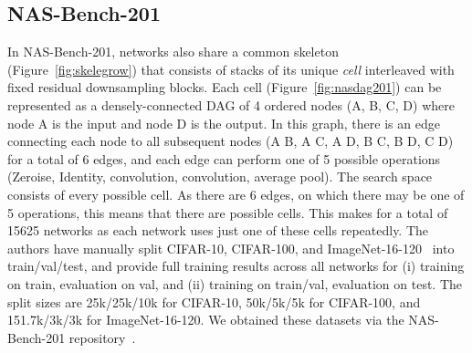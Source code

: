 \documentclass{article}
\begin{document}
\subsection{NAS-Bench-201}
\label{sec:nasbench201}


In NAS-Bench-201, networks also share a common skeleton (Figure~\ref{fig:skelegrow}) that consists of stacks of its unique {\it cell} interleaved with fixed residual downsampling blocks. Each cell (Figure~\ref{fig:nasdag201}) can be represented as a densely-connected DAG of 4 ordered nodes (A, B, C, D) where node A is the input and node D is the output. In this graph, there is an edge connecting each node to all subsequent nodes (A B, A C, A D, B C, B D, C D) for a total of 6 edges, and each edge can perform one of 5 possible operations (Zeroise, Identity,  convolution,  convolution,  average pool). The search space consists of every possible cell. As there are 6 edges, on which there may be one of 5 operations, this means that there are  possible cells. This makes for a total of 15625 networks as each network uses just one of these cells repeatedly. The authors have manually split CIFAR-10, CIFAR-100, and ImageNet-16-120~\citep{chrabaszcz2017downsampled} into train/val/test, and provide full training results across all networks for (i) training on train, evaluation on val, and (ii) training on train/val, evaluation on test. The split sizes are 25k/25k/10k for CIFAR-10, 50k/5k/5k for CIFAR-100, and 151.7k/3k/3k for ImageNet-16-120. We obtained these datasets via the NAS-Bench-201 repository~\citep{dong_2020}.
\end{document}
